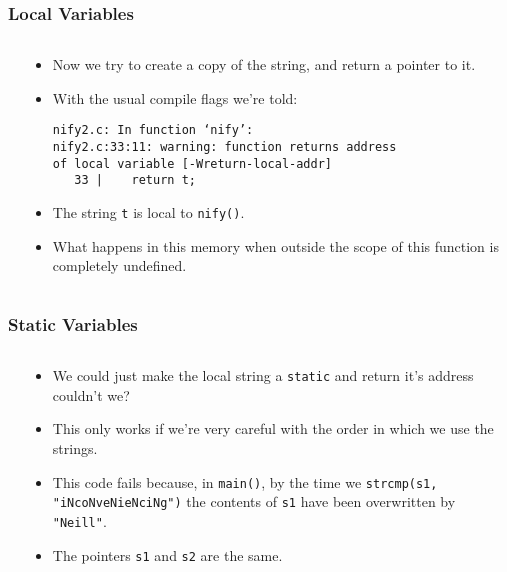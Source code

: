 \begin{frame}[fragile]
\frametitle{Local Variables}
\begin{columns}[T]

\begin{column}{0.35\textwidth}

\end{column}

\pause
\begin{column}{0.55\textwidth}
\begin{itemize}[<+->]
\item Now we try to create a copy of the string, and return a pointer to it.
\item With the usual compile flags we're told:
\begin{verbatim}
nify2.c: In function ‘nify’:
nify2.c:33:11: warning: function returns address
of local variable [-Wreturn-local-addr]
   33 |    return t;
\end{verbatim}
\item The string \verb^t^ is local to \verb^nify()^.
\item What happens in this memory when outside the scope of this function is completely undefined.
\end{itemize}
\end{column}

\end{columns}
\end{frame}


\begin{frame}[fragile]
\frametitle{Static Variables}
\begin{columns}[T]

\begin{column}{0.35\textwidth}

\end{column}

\pause
\begin{column}{0.55\textwidth}
\begin{itemize}[<+->]
\item We could just make the local string a \verb^static^ and return it's address couldn't we?
\item This only works if we're very careful with the order in which we use the strings.
\item This code fails because, in \verb^main()^, by the time we \verb^strcmp(s1, "iNcoNveNieNciNg")^ the contents of \verb^s1^ have been overwritten by \verb^"Neill"^. 
\item The pointers \verb^s1^ and \verb^s2^ are the same.
\end{itemize}
\end{column}

\end{columns}
\end{frame}

